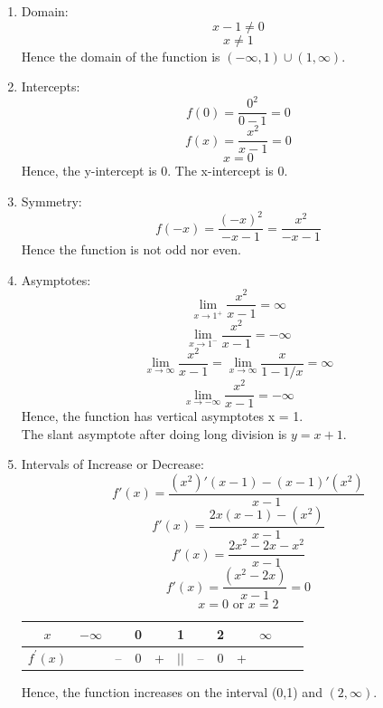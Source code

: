\documentclass[12pt]{article}
\begin{document}
\begin{enumerate}
                \begin{enumerate}
                    \item Domain:
                        \[x - 1 \neq 0\]
                        \[x \neq 1\]
                    Hence the domain of the function is $(-\infty, 1) \cup (1, \infty)$.
                    \item Intercepts:
                        \[f(0) = \frac{0^2}{0-1} = 0\]
                        \[f(x) = \frac{x^2}{x-1} = 0\]
                        \[x = 0\]
                    Hence, the y-intercept is 0.
                    The x-intercept is 0.
                    \item Symmetry:
                        \[f(-x) = \frac{(-x)^2}{-x-1} = \frac{x^2}{-x-1}\]
                    Hence the function is not odd nor even.
                    \item Asymptotes:
                        \[\lim_{x \to 1^+} \frac{x^2}{x-1} = \infty\]
                        \[\lim_{x \to 1^-} \frac{x^2}{x-1} = -\infty\]
                        \[\lim_{x \to \infty} \frac{x^2}{x-1} = \lim_{x \to \infty} \frac{x}{1-1/x} = \infty\]
                        \[\lim_{x \to -\infty} \frac{x^2}{x-1} = -\infty\]
                        Hence, the function has vertical asymptotes x = 1.\\
                        The slant asymptote after doing long division is $y = x + 1$.
                    \item Intervals of Increase or Decrease:
                        \[f'(x) = \frac{(x^2)'(x-1) - (x-1)'(x^2)}{x-1}\]
                        \[f'(x) = \frac{2x(x-1) - (x^2)}{x-1}\]
                        \[f'(x) = \frac{2x^2- 2x - x^2}{x-1}\]
                        \[f'(x) = \frac{(x^2- 2x)}{x-1} = 0\]
                        \[x = 0 \text{ or } x = 2\]
                        \begin{center}
                            \begin{tabular}{c c c c c c c c c c c c}
                                $x$ & $-\infty$ & ~ & 0 & ~ & 1 & ~ & 2 & ~ & $\infty$ \\ 
                                \hline 
                                $f^{\prime} (x)$ & ~ & -- & 0 & + & $||$ & -- & 0 & + \\ 
                            \end{tabular}    
                        \end{center}
                        Hence, the function increases on the interval (0,1) and $(2,\infty)$.\\

\end{enumerate}
\end{enumerate}
\end{document}

